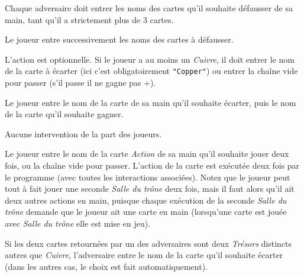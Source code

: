 \documentclass[12pt]{td}
\begin{document}
{Chaque adversaire doit entrer les noms des cartes qu'il souhaite défausser de sa main, tant qu'il a strictement plus de 3 cartes.}

{Le joueur entre successivement les noms des cartes à défausser.}

{L'action est optionnelle. Si le joueur a au moins un \emph{Cuivre}, il doit entrer le nom de la carte à écarter (ici c'est obligatoirement \texttt{"Copper"}) ou entrer la chaîne vide pour passer (s'il passe il ne gagne pas +).}

{Le joueur entre le nom de la carte de sa main qu'il souhaite écarter, puis le nom de la carte qu'il souhaite gagner.}

{Aucune intervention de la part des joueurs.}

{Le joueur entre le nom de la carte \emph{Action} de sa main qu'il souhaite jouer deux fois, ou la chaîne vide pour passer. L'action de la carte est exécutée deux fois par le programme (avec toutes les interactions associées). Notez que le joueur peut tout à fait jouer une seconde \emph{Salle du trône} deux fois, mais il faut alors qu'il ait deux autres actions en main, puisque chaque exécution de la seconde \emph{Salle du trône} demande que le joueur ait une carte en main (lorsqu'une carte est jouée avec \emph{Salle du trône} elle est mise en jeu).}

{Si les deux cartes retournées par un des adversaires sont deux \emph{Trésors} distincts autres que \emph{Cuivre}, l'adversaire entre le nom de la carte qu'il souhaite écarter (dans les autres cas, le choix est fait automatiquement).}
\end{document}
